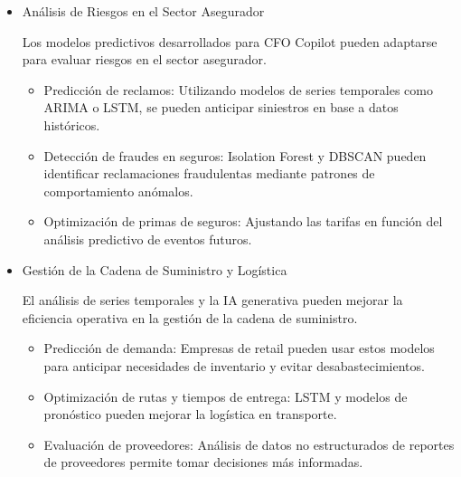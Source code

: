 \documentclass[12pt,letterpaper,oneside]{report}
\renewcommand{\_}{\UnderscoreOriginal\allowbreak}
\begin{document}
\begin{itemize}
Más allá del ámbito financiero, los avances y técnicas desarrolladas en el CFO Copilot pueden ser extrapolados a diversos sectores donde la automatización y el análisis de datos desempeñan un papel crucial.

En este sentido, si bien la investigación sobre CFO Copilot se centra en la automatización y optimización del análisis financiero, sus hallazgos y metodologías pueden aplicarse en múltiples. La combinación de inteligencia artificial generativa (GenAI), modelos de machine learning para series temporales y análisis de datos estructurados y no estructurados tiene un gran potencial en diversas industrias. A continuación, se presentan algunas de las principales aplicaciones prácticas fuera del ámbito original de la solución.

\item Análisis de Riesgos en el Sector Asegurador \parencite{Cai2024} \parencite{RamosPerez2021}

Los modelos predictivos desarrollados para CFO Copilot pueden adaptarse para evaluar riesgos en el sector asegurador.
\begin{itemize}
\item Predicción de reclamos: Utilizando modelos de series temporales como ARIMA o LSTM, se pueden anticipar siniestros en base a datos históricos.
\item Detección de fraudes en seguros: Isolation Forest y DBSCAN pueden identificar reclamaciones fraudulentas mediante patrones de comportamiento anómalos.
\item Optimización de primas de seguros: Ajustando las tarifas en función del análisis predictivo de eventos futuros.
\end{itemize}

\item Gestión de la Cadena de Suministro y Logística \parencite{Ahn2024} \parencite{Chang2024}

El análisis de series temporales y la IA generativa pueden mejorar la eficiencia operativa en la gestión de la cadena de suministro.
\begin{itemize}
\item Predicción de demanda: Empresas de retail pueden usar estos modelos para anticipar necesidades de inventario y evitar desabastecimientos.
\item Optimización de rutas y tiempos de entrega: LSTM y modelos de pronóstico pueden mejorar la logística en transporte.
\item Evaluación de proveedores: Análisis de datos no estructurados de reportes de proveedores permite tomar decisiones más informadas.
\end{itemize}


\end{itemize}
\end{document}

